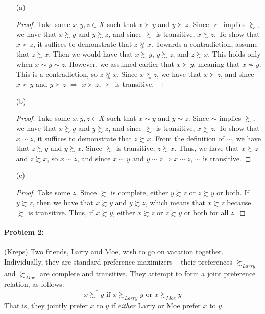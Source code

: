 \documentclass[12pt]{article}
\begin{document}
    \begin{itemize}
        \item[(a)] \begin{proof} Take some $x,y,z \in X$ such that $x \succ y$ and $y \succ z$. Since $\succ$ implies $\succsim$, we have that $x \succsim y$ and $y \succsim z$, and since $\succsim$ is transitive, $x \succsim z$. To show that $x \succ z$, it suffices to demonstrate that $z \not\succsim x$. Towards a contradiction, assume that $z \succsim x$. Then we would have that $x \succsim y$, $y \succsim z$, and $z \succsim x$. This holds only when $x \sim y \sim z$. However, we assumed earlier that $x \succ y$, meaning that $x \not\sim y$. This is a contradiction, so $z \not\succsim x$. Since $x \succsim z$, we have that $x \succ z$, and since $x \succ y$ and $y \succ z$ $\Rightarrow$ $x \succ z$, $\succ$ is transitive. \end{proof}

        \item[(b)] \begin{proof} Take some $x,y,z \in X$ such that $x \sim y$ and $y \sim z$. Since $\sim$ implies $\succsim$, we have that $x \succsim y$ and $y \succsim z$, and since $\succsim$ is transitive, $x \succsim z$. To show that $x \sim z$, it suffices to demonstrate that $z \succsim x$. From the definition of $\sim$, we have that $z \succsim y$ and $y \succsim x$. Since $\succsim$ is transitive, $z \succsim x$. Thus, we have that $x \succsim z$ and $z \succsim x$, so $x \sim z$, and since $x \sim y \text{ and } y \sim z \Rightarrow x \sim z$, $\sim$ is transitive. \end{proof}

        \item[(c)] \begin{proof} Take some $z$. Since $\succsim$ is complete, either $y \succsim z$ or $z \succsim y$ or both. If $y \succsim z$, then we have that $x \succsim y$ and $y \succsim z$, which means that $x \succsim z$ because $\succsim$ is transitive. Thus, if $x \succsim y$, either $x \succsim z$ or $z \succsim y$ or both for all $z$. \end{proof}
    \end{itemize}

\paragraph{Problem 2:} (Kreps) Two friends, Larry and Moe, wish to go on vacation together. Individually, they are standard preference maximizers -- their preferences $\succsim_{Larry}$ and $\succsim_{Moe}$ are complete and transitive. They attempt to form a joint preference relation, as follows:
\[
x \succsim^* y \text{ if } x \succsim_{Larry} y \text{ or } x \succsim_{Moe} y
\]
That is, they jointly prefer $x$ to $y$ if \emph{either} Larry or Moe prefer $x$ to $y$. 
\end{document}
